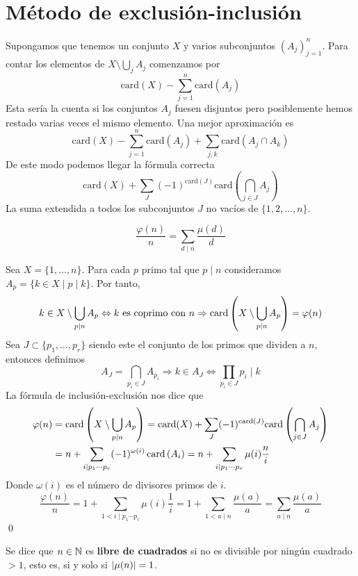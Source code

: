 \documentclass[TAN.tex]{subfiles}
\begin{document}
\section{Método de exclusión-inclusión}
Supongamos que tenemos un conjunto $X$ y varios subconjuntos $(A_j)_{j=1}^n$. Para contar los elementos de $X \setminus \bigcup_j A_j$ comenzamos por
\[ \text{card}(X) - \sum_{j=1}^n \text{card}(A_j) \]
Esta sería la cuenta si los conjuntos $A_j$ fuesen disjuntos pero posiblemente hemos restado varias veces el mismo elemento. Una mejor aproximación es
\[ \text{card}(X) - \sum_{j=1}^n \text{card}(A_j) + \sum_{j,k} \text{card}(A_j \cap A_k) \]
De este modo podemos llegar la fórmula correcta
\[ \text{card}(X) + \sum_J (-1)^{\text{card}(J)} \text{card}\left(\bigcap_{j\in J} A_j\right) \]
La suma extendida a todos los subconjuntos $J$ no vacíos de $\{1,2,\dots,n\}$.

\begin{prop}
\[ \frac{φ(n)}{n} = \sum_{d\mid n} \frac{μ(d)}{d} \]
\end{prop}
\begin{dem}
Sea $X=\{1,\dotsc,n\}$. Para cada $p$ primo tal que $p\mid n$ consideramos $A_p =\{k\in X\mid p\mid k\}$. Por tanto, 
$$k\in X \setminus \bigcup_{p\mid n} A_p \Leftrightarrow \text{$k$ es coprimo con $n$} \Rightarrow \operatorname{card}\left( X \setminus \bigcup_{p\mid n} A_p\right) = \varphi(n)
$$
Sea $J\subset \{p_1,\dotsc,p_r\}$ siendo este el conjunto de los primos que dividen a $n$, entonces definimos
$$
A_J = \bigcap_{p_i \in J}A_{p_i} \Rightarrow k \in A_J \Leftrightarrow \prod_{p_i\in J} p_i \mid k
$$
La fórmula de inclusión-exclusión nos dice que
\begin{align*}
\varphi(n) &= \operatorname{card}\left( X \setminus \bigcup_{p\mid n} A_p\right) =  \text{card}(X) + \sum_J (-1)^{\text{card}(J)} \text{card}\left(\bigcap_{j\in J} A_j\right)\\
&= n + \sum_{i\mid p_1\cdots p_r} (-1)^{\omega(i)} \operatorname{card}\left(A_i\right) = n + \sum_{i\mid p_1 \cdots p_r} \mu(i)\frac{n}{i}
\end{align*}
Donde $\omega(i)$ es el número de divisores primos de $i$.
$$
\frac{\varphi(n)}{n} = 1 + \sum_{1<i\mid p_1 \cdots p_r} \mu(i)\frac{1}{i} = 1 + \sum_{1<a\mid n}\frac{\mu(a)}{a} = \sum_{a\mid n} \frac{\mu(a)}{a}
$$
\qed
\end{dem}
Se dice que $n \in \mathbb{N}$ es \textbf{libre de cuadrados} si no es divisible por ningún cuadrado $> 1$, esto es, si y solo si $\left|\mu(n)\right|=1$.
\end{document}
